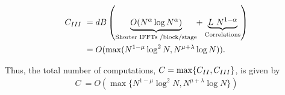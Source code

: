 \begin{enumerate}
	\begin{align*}	
	C_{\RNum{3}} \ &=  {d B}  \left (
	\underset{\text{Shorter IFFTs /block/stage} }{\underbrace{ O(N^{\alpha}  \log N^{\alpha})}} \hspace{-3pt}+ \underset{\text{Correlations} }{\underbrace{ L~N^{1-\alpha}}} \right )\\
	&=  O(\max(N^{1-\mu}\log^2 N ,N^{\mu+\lambda}\log N)).
	\end{align*}

\end{enumerate}

Thus, the total number of computations, $C = \max\{C_{\RNum{2}},C_{\RNum{3}}\} $, is given by
  \begin{align*}
  C ~ = O\left(\max\{N^{1-\mu}\log^2 N, N^{\mu+\lambda}\log N \}\right)
  \end{align*}
